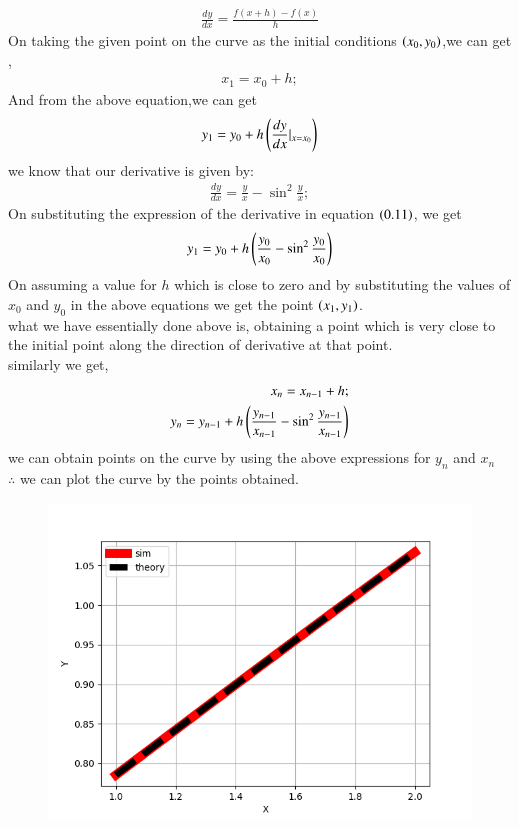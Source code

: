 \documentclass[journal]{IEEEtran}
\begin{document}
\begin{align}
    \frac{dy}{dx}=\frac{f(x+h)-f(x)}{h}      
\end{align}
On taking the given point on the curve as the initial conditions $\left(x_0,y_0\right)$,we can get ,
\begin{align}
    x_1 = x_0 + h;
\end{align}
And from the above equation,we can get
\begin{align}
  y_1 = y_0 + h\left(\frac{dy}{dx}|_{x=x_0}\right)   
\end{align}
we know that our derivative is given by:\\
\begin{align}
    \frac{dy}{dx} = \frac{y}{x} - \sin^2{\frac{y}{x}};
\end{align}
On substituting the expression of the derivative in equation $\left(0.11\right)$, we get
\begin{align}
    y_1 = y_0 + h\left(\frac{y_0}{x_0} - \sin^2{\frac{y_0}{x_0}}\right) 
\end{align}
On assuming a value for $h$ which is close to zero  and by substituting the values of $x_0$ and $y_0$ in the above equations we get the point $\left(x_1,y_1\right)$. \\
what we have essentially done above is, obtaining a point which is very close to the initial point along the direction of derivative at that point.\\
similarly we get,
\begin{align}
    x_n = x_{n-1} + h ;\\
y_n = y_{n-1} + h\left(\frac{y_{n-1}}{x_{n-1}} - \sin^2{\frac{y_{n-1}}{x_{n-1}}}\right)
\end{align}
we can obtain points on the curve by using the above expressions for $y_n$ and $x_n$\\
 $\therefore$ we can plot the curve by the points obtained.
\begin{figure}[h!]
   \centering
   \includegraphics[width=0.75\columnwidth]{figures/Figure_1.png}
\end{figure}
\end{document}
